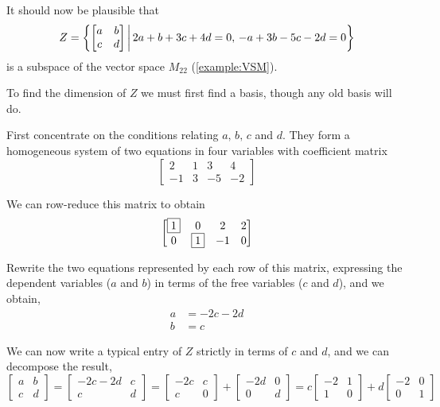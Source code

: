 \documentclass{ximera}
\begin{document}
\begin{example}
  It should now be plausible that
  \[
    Z=\left\lbrace\begin{bmatrix}a&b\\c&d\end{bmatrix}\,\middle|\,2a+b+3c+4d=0,\,-a+3b-5c-2d=0\right\rbrace
  \]
  is a subspace of the vector space $M_{22}$ (\ref{example:VSM}).  

  To find the dimension of $Z$ we must first find a basis, though any old basis will do.

  First concentrate on the conditions relating $a,\,b,\,c$ and $d$.  They form a homogeneous system of two equations in four variables with coefficient matrix
  \[
    \begin{bmatrix}
      2 & 1 & 3 & 4\\
      -1 & 3 & -5 & -2
    \end{bmatrix}
  \]

  We can row-reduce this matrix to obtain
  \[
    \begin{bmatrix}
      \fbox{1} & 0 & 2 & 2\\
      0 & \fbox{1} & -1 & 0
    \end{bmatrix}
  \]
  
  Rewrite the two equations represented by each row of this matrix, expressing the dependent variables ($a$ and $b$) in terms of the free variables ($c$ and $d$), and we obtain,
  \begin{align*}
    a&=-2c-2d\\
    b&=c
  \end{align*}

  We can now write a typical entry of $Z$ strictly in terms of $c$ and $d$, and we can decompose the result,
  \[
    \begin{bmatrix}a&b\\c&d\end{bmatrix}=
    \begin{bmatrix}-2c-2d&c\\c&d\end{bmatrix}=
    \begin{bmatrix}-2c&c\\c&0\end{bmatrix}+
    \begin{bmatrix}-2d&0\\0&d\end{bmatrix}=
    c\begin{bmatrix}-2&1\\1&0\end{bmatrix}+
    d\begin{bmatrix}-2&0\\0&1\end{bmatrix}
  \]


\end{example}
\end{document}
